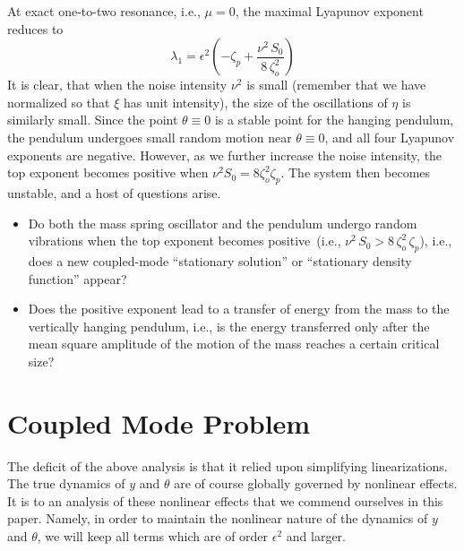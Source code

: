 At exact one-to-two resonance, i.e., $\mu=0$, the maximal Lyapunov exponent reduces to
\begin{equation}
\lambda_1 = \epsilon^2 \left( - \zeta_p + \frac{{\nu}^2 \, S_0}{8 \, \zeta_o^2} \right)
\end{equation}
It is clear, that when the noise intensity $\nu^2$ is small (remember that we have normalized so that $\xi$ has unit intensity), the size of the oscillations of $\eta$ is similarly small. Since the point $\theta\equiv 0$ is a stable point for the hanging pendulum, the pendulum undergoes small random motion near $\theta\equiv 0$, and all four Lyapunov exponents are negative. However, as we further increase the noise intensity, the top exponent becomes positive when $\nu^2 S_0 = 8 \zeta_o^2 \zeta_p$. The system then becomes unstable, and a host of questions arise.
\begin{itemize}
\item Do both the mass spring oscillator and the pendulum undergo random vibrations when the top exponent becomes positive~(i.e., ${\nu}^2 \, S_{0} > 8\,\zeta_o^2\,\zeta_p$), i.e., does a new coupled-mode ``stationary solution'' or ``stationary density function'' appear?
\item Does the positive exponent lead to a transfer of energy from the mass to the vertically hanging pendulum, i.e., is the energy transferred only after the mean square amplitude of the motion of the mass reaches a certain critical size?
\end{itemize}

\section{Coupled Mode Problem}
\label{S:statement}

The deficit of the above analysis is that it relied upon simplifying linearizations. The true dynamics of $y$ and $\theta$ are of course globally governed by nonlinear effects. It is to an analysis of these nonlinear effects that we commend ourselves in this paper. Namely, in order to maintain the nonlinear nature of the dynamics of $y$ and $\theta$, we will keep all terms which are of order $\epsilon^2$ and larger.

